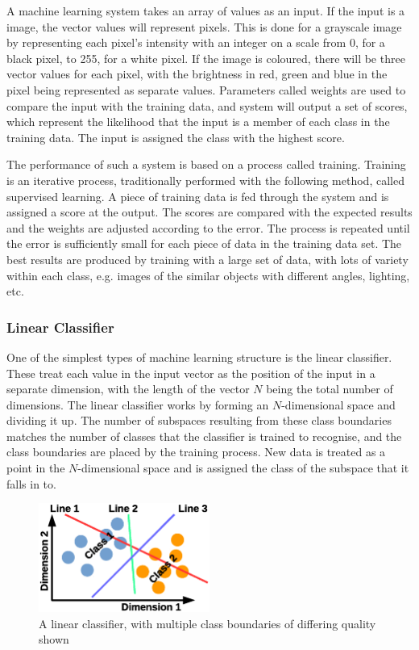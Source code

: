 \documentclass[12pt]{article}
\begin{document}
A machine learning system takes an array of values as an input. If the input is a image, the vector values will represent pixels. This is done for a grayscale image by representing each pixel's intensity with an integer on a scale from 0, for a black pixel, to 255, for a white pixel. If the image is coloured, there will be three vector values for each pixel, with the brightness in red, green and blue in the pixel being represented as separate values. Parameters called weights are used to compare the input with the training data, and system will output a set of scores, which represent the likelihood that the input is a member of each class in the training data. The input is assigned the class with the highest score. 

The performance of such a system is based on a process called training.  Training is an iterative process, traditionally performed with the following method, called supervised learning. A piece of training data is fed through the system and is assigned a score at the output. The scores are compared with the expected results and the weights are adjusted according to the error. The process is repeated until the error is sufficiently small for each piece of data in the training data set. The best results are produced by training with a large set of data, with lots of variety within each class, e.g. images of the similar objects with different angles, lighting, etc.

\subsubsection{Linear Classifier}
\label{sec:Background-ML-LC}

One of the simplest types of machine learning structure is the linear classifier. These treat each value in the input vector as the position of the input in a separate dimension, with the length of the vector $N$ being the total number of dimensions. The linear classifier works by forming an $N$-dimensional space and dividing it up. The number of subspaces resulting from these class boundaries matches the number of classes that the classifier is trained to recognise, and the class boundaries are placed by the training process. New data is treated as a point in the $N$-dimensional space and is assigned the class of the subspace that it falls in to.

\begin{figure}[H]
\centering
\includegraphics[width=0.5\textwidth]{figures/SVM.eps}
\caption{A linear classifier, with multiple class boundaries of differing quality shown}
\label{fig:SVM}
\end{figure}
\end{document}
